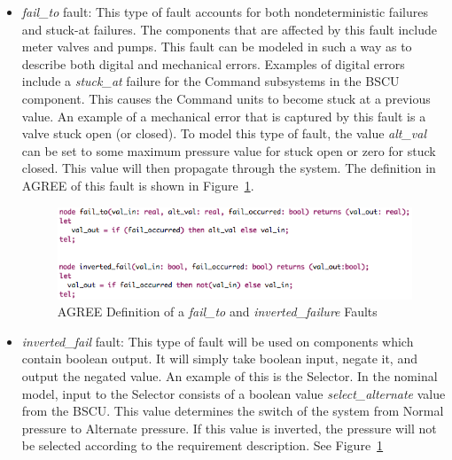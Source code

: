 \begin{itemize}
\item \textit{fail\_to} fault: This type of fault accounts for both nondeterministic failures and stuck-at failures. The components that are affected by this fault include meter valves and pumps. This fault can be modeled in such a way as to describe both digital and mechanical errors. Examples of digital errors include a \textit{stuck\_at} failure for the Command subsystems in the BSCU component. This causes the Command units to become stuck at a previous value. An example of a mechanical error that is captured by this fault is a valve stuck open (or closed). To model this type of fault, the value \textit{alt\_val} can be set to some maximum pressure value for stuck open or zero for stuck closed. This value will then propagate through the system. The definition in AGREE of this fault is shown in Figure~\ref{fig:failureNodes}.\\

\begin{figure}[h!]
  \centering
 \includegraphics[width=1\textwidth]{images/failureNodes.png}
  \vspace{-0.1in}
  \caption{AGREE Definition of a \textit{fail\_to} and \textit{inverted\_failure} Faults}
  \label{fig:failureNodes}
\end{figure}


\item \textit{inverted\_fail} fault: This type of fault will be used on components which contain boolean output. It will simply take boolean input, negate it, and output the negated value. An example of this is the Selector. In the nominal model, input to the Selector consists of a boolean value \textit{select\_alternate} value from the BSCU. This value determines the switch of the system from Normal pressure to Alternate pressure. If this value is inverted, the pressure will not be selected according to the requirement description.  See Figure~\ref{fig:failureNodes}

\end{itemize}



